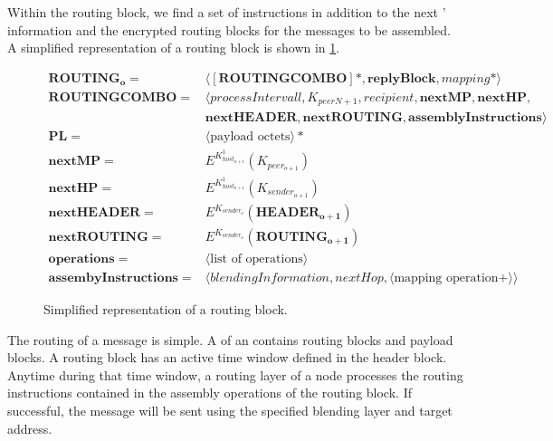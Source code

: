Within the routing block, we find a set of instructions in addition to the next \VortexNodes{}' information and the encrypted routing blocks for the messages to be assembled.
 A simplified representation of a routing block is shown in \cref{fig:mathRoutingSimplified}.

\begin{figure}[!ht]
	\begin{align}
		\mathbf{ROUTING_o}           = & \langle [ \mathbf{ROUTINGCOMBO} ] *, \mathbf{replyBlock},mapping* \rangle\\  
		\mathbf{ROUTINGCOMBO}        = & \langle processIntervall, K_{peerN+1}, recipient, \mathbf{nextMP}, \mathbf{nextHP}, \nonumber \\
		& \mathbf{nextHEADER}, \mathbf{nextROUTING}, \mathbf{assemblyInstructions} \rangle\\
		\mathbf{PL}                  = & \langle \text{payload octets} \rangle *\\ 
		\mathbf{nextMP}              = & E^{K^1_{host_{o+1}}} \left( K_{peer_{o+1}} \right)\\
		\mathbf{nextHP}              = & E^{K^1_{host_{o+1}}} \left( K_{sender_{o+1}} \right)\\
		\mathbf{nextHEADER}          = & E^{K_{sender_o}} \left( \mathbf{HEADER_{o+1}} \right)\\
		\mathbf{nextROUTING}         = & E^{K_{sender_o}} \left( \mathbf{ROUTING_{o+1}} \right)\\    
		\mathbf{operations}          = & \langle \text{list of operations} \rangle \\
		\mathbf{assembyInstructions} = & \langle  blendingInformation, nextHop, \langle \text{mapping operation} +\rangle \rangle
	\end{align}
	\caption{Simplified representation of a routing block.}
	\label{fig:mathRoutingSimplified}
\end{figure}

The routing of a message is simple. A  of an  contains routing blocks and payload blocks. A routing block has an active time window defined in the header block. Anytime during that time window, a routing layer of a node processes the routing instructions contained in the assembly operations of the routing block. If successful, the message will be sent using the specified blending layer and target address.

